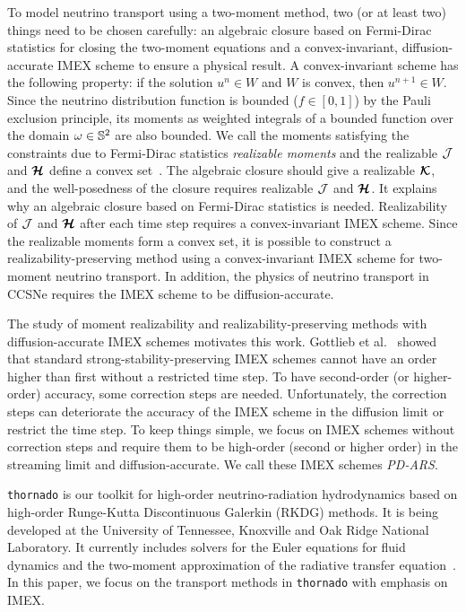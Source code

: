 To model neutrino transport using a two-moment method, two (or at least two) things need to be chosen carefully: an algebraic closure based on Fermi-Dirac statistics for closing the two-moment equations and a convex-invariant, diffusion-accurate IMEX scheme to ensure a physical result.
A convex-invariant scheme has the following property: if the solution $u^{n}\in W$ and $W$ is convex, then $u^{n+1}\in W$.
Since the neutrino distribution function is bounded ($f\in[0,1]$) by the Pauli exclusion principle, its moments as weighted integrals of a bounded function over the domain $\omega\in\mathbb{S}^{2}$ are also bounded.
We call the moments satisfying the constraints due to Fermi-Dirac statistics \textit{realizable moments} and the realizable $\mathcal{J}$ and $\boldsymbol{\mathcal{H}}$ define a convex set~\cite{chu_etal_2018}.
The algebraic closure should give a realizable $\boldsymbol{\mathcal{K}}$, and the well-posedness of the closure requires realizable $\mathcal{J}$ and $\boldsymbol{\mathcal{H}}$.
It explains why an algebraic closure based on Fermi-Dirac statistics is needed.
Realizability of $\mathcal{J}$ and $\boldsymbol{\mathcal{H}}$ after each time step requires a convex-invariant IMEX scheme.
Since the realizable moments form a convex set, it is possible to construct a realizability-preserving method using a convex-invariant IMEX scheme for two-moment neutrino transport.
In addition, the physics of neutrino transport in CCSNe requires the IMEX scheme to be diffusion-accurate.

The study of moment realizability and realizability-preserving methods with diffusion-accurate IMEX schemes motivates this work.
Gottlieb et al.~\cite{gottlieb_etal_2001} showed that standard strong-stability-preserving IMEX schemes cannot have an order higher than first without a restricted time step.
To have second-order (or higher-order) accuracy, some correction steps are needed.
Unfortunately, the correction steps can deteriorate the accuracy of the IMEX scheme in the diffusion limit or restrict the time step.
To keep things simple, we focus on IMEX schemes without correction steps and require them to be high-order (second or higher order) in the streaming limit and diffusion-accurate.
We call these IMEX schemes \textit{PD-ARS}.

\texttt{thornado} is our toolkit for high-order neutrino-radiation hydrodynamics based on high-order Runge-Kutta Discontinuous Galerkin (RKDG) methods.
It is being developed at the University of Tennessee, Knoxville and Oak Ridge National Laboratory.
It currently includes solvers for the Euler equations for fluid dynamics and the two-moment approximation of the radiative transfer equation~\cite{endeve_etal_2018}.
In this paper, we focus on the transport methods in \texttt{thornado} with emphasis on IMEX.

